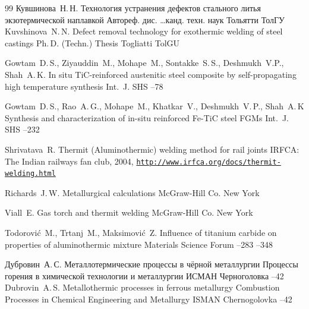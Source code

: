 \begin{thebibliography}{99}
\by Кувшинова~Н.\,Н.
\thesis Технология устранения дефектов стального литья экзотермической наплавкой
\thesisinfo Автореф. дис. \dots канд. техн. наук
\publaddr Тольятти
\publ ТолГУ
\misctransl 
\by Kuvshinova~N.\,N.
\thesis  Defect removal technology  for exothermic welding  of steel castings 
\thesisinfo Ph.\,D. (Techn.) Thesis 
\publaddr Togliatti
\publ TolGU


\by Gowtam~D.\,S., Ziyauddin~M., Mohape~M., Sontakke~S.\,S., Deshmukh~V.P., Shah~A.\,K.
\paper In situ TiC-reinforced austenitic steel composite by self-propagating high temperature synthesis
\jour Int.~J. SHS
--78

\by Gowtam~D.\,S., Rao~A.\,G., Mohape~M., Khatkar~V., Deshmukh~V.\,P., Shah~A.\,K
\paper Synthesis and characterization of in-situ reinforced Fe-TiC steel FGMs
\jour Int.~J. SHS
--232

\by Shrivatava~R.
\eprint Thermit (Aluminothermic) welding method for rail joints
\eprintinfo IRFCA: The Indian railways fan club, 2004,
\href{http://www.irfca.org/docs/thermit-welding.html}{\tt  http://www.irfca.org/docs/thermit-welding.html}


\by Richards~J.\,W.
\book Metallurgical calculations
\publ McGraw-Hill Co.
\publaddr New York

\by Viall~E.
\book Gas torch and thermit welding
\publ McGraw-Hill Co.
\publaddr New York


\by Todorovi\'c~M., Trtanj~M., Maksimovi\'c~Z.
\paper Influence of titanium carbide on properties of aluminothermic mixture
\jour  Materials Science Forum 
--283
--348


\by Дубровин~А.\,С.
\paper Металлотермические процессы в чёрной металлургии
\inbook Процессы горения в химической технологии и металлургии
\publ ИСМАН
\publaddr Черноголовка
--42
\misctransl
\by Dubrovin~A.\,S.
\paper Metallothermic processes in ferrous metallurgy
\inbook Combustion Processes in Chemical Engineering and Metallurgy
\publ ISMAN
\publaddr Chernogolovka
--42


\end{thebibliography}

